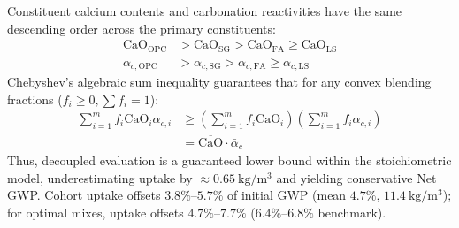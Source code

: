 \documentclass[journal]{IEEEtran}
\begin{document}
Constituent calcium contents and carbonation reactivities have the same descending order across the primary constituents:
\begin{align}
\mathrm{CaO}_{\mathrm{OPC}} &> \mathrm{CaO}_{\mathrm{SG}} > \mathrm{CaO}_{\mathrm{FA}} \ge \mathrm{CaO}_{\mathrm{LS}} \label{eq:cheb_order1} \\
\alpha_{c,\mathrm{OPC}} &> \alpha_{c,\mathrm{SG}} > \alpha_{c,\mathrm{FA}} \ge \alpha_{c,\mathrm{LS}} \label{eq:cheb_order2}
\end{align}
Chebyshev's algebraic sum inequality guarantees that for any convex blending fractions ($f_i \ge 0, \sum f_i = 1$):
\begin{equation}
\begin{aligned}
\sum_{i=1}^m f_i \mathrm{CaO}_i \alpha_{c,i}
&\ge \left( \sum_{i=1}^m f_i \mathrm{CaO}_i \right) \left( \sum_{i=1}^m f_i \alpha_{c,i} \right) \\
&= \overline{\mathrm{CaO}} \cdot \bar{\alpha}_c
\end{aligned}
\label{eq:chebyshev}
\end{equation}
Thus, decoupled evaluation is a guaranteed lower bound within the stoichiometric model, underestimating uptake by $\approx 0.65\ \mathrm{kg/m^3}$ and yielding conservative Net GWP. Cohort uptake offsets $3.8\%\text{--}5.7\%$ of initial GWP (mean $4.7\%$, $11.4\ \mathrm{kg/m^3}$); for optimal mixes, uptake offsets $4.7\%\text{--}7.7\%$ ($6.4\%\text{--}6.8\%$ benchmark).
\end{document}
